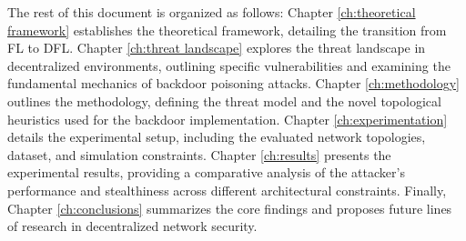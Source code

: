 The rest of this document is organized as follows: Chapter \ref{ch:theoretical framework} establishes the theoretical framework, detailing the transition from FL to DFL. Chapter \ref{ch:threat landscape} explores the threat landscape in decentralized environments, outlining specific vulnerabilities and examining the fundamental mechanics of backdoor poisoning attacks. Chapter \ref{ch:methodology} outlines the methodology, defining the threat model and the novel topological heuristics used for the backdoor implementation. Chapter \ref{ch:experimentation} details the experimental setup, including the evaluated network topologies, dataset, and simulation constraints. Chapter \ref{ch:results} presents the experimental results, providing a comparative analysis of the attacker's performance and stealthiness across different architectural constraints. Finally, Chapter \ref{ch:conclusions} summarizes the core findings and proposes future lines of research in decentralized network security.